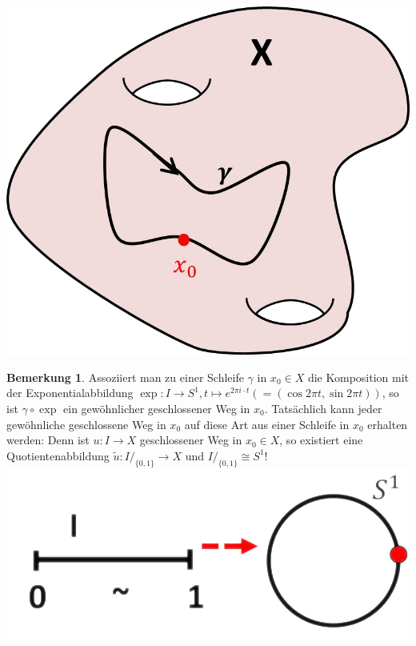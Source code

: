 \documentclass[a4paper,11pt,notitlepage]{report}
\theoremstyle{definition}
\newtheorem{remark}{Bemerkung}[chapter]
\newenvironment{definition}[1]{
	\begin{definitions}
	\marginnote{\emph{#1}}
}{\end{definitions}}
\begin{document}
\begin{definition}{Schleife}
	 \newline \includegraphics[scale=0.3]{images/Schleife.png}
\end{definition}

\begin{remark}{}
	Assoziiert man zu einer Schleife $\gamma$ in $x_0 \in X$ die Komposition mit der Exponentialabbildung $\exp \colon I \rightarrow S^1, t \mapsto e^{2 \pi i \cdot t} (= (\cos 2 \pi t, \sin 2 \pi t))$, so ist $\gamma \circ \exp$ ein gewöhnlicher geschlossener Weg in $x_0$.
	\newline
	Tatsächlich kann jeder gewöhnliche geschlossene Weg in $x_0$ auf diese Art aus einer Schleife in $x_0$ erhalten werden:
	\newline
	Denn ist $u \colon I \rightarrow X$ geschlossener Weg in $x_0 \in X$, so existiert eine Quotientenabbildung $\tilde{u}\colon I/_{\{0,1\}} \rightarrow X$ und $I/_{\{0,1\}} \cong S^1!$\newline
	\includegraphics[scale=0.3]{images/I_S1.png}
\end{remark}
\end{document}
